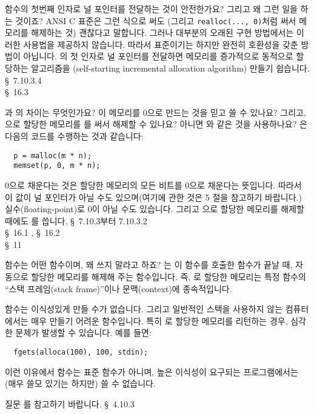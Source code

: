 \begin{faq}
	 함수의 첫번째 인자로 널 포인터를 전달하는
	것이 안전한가요? 그리고 왜 그런 일을 하는 것이죠?
\A
	ANSI C 표준은 그런 식으로 써도 (그리고 \verb+realloc(..., 0)+처럼
	써서 메모리를 해제하는 것) 괜찮다고 말합니다.  그러나 대부분의
	오래된 구현 방법에서는 이러한 사용법을 제공하지 않습니다.
	따라서 표준이기는 하지만 완전히 호환성을 갖춘 방법이 아닙니다.
	의 첫 인자로 널 포인터를 전달하면 메모리를
	증가적으로 동적으로 할당하는 알고리즘을 (self-starting incremental
	allocation algorithm) 만들기 쉽습니다.
\R
	\cite{c89} \S\ 7.10.3.4 \\
	\cite{hs} \S\ 16.3 
\end{faq}

\begin{faq}
	과 의 차이는 무엇인가요?
	이 메모리를 0으로 만드는 것을 믿고 쓸 수 있나요?
	그리고, 으로 할당한 메모리를 를 써서
	해제할 수 있나요? 아니면 와 같은 것을 사용하나요?
\A
	은 다음의 코드를 수행하는 것과 같습니다:
\begin{verbatim}
  p = malloc(m * n);
  memset(p, 0, m * n);
\end{verbatim}
	\noindent 0으로 채운다는 것은 할당한 메모리의 모든 비트를
	0으로 채운다는 뜻입니다.  따라서 이 값이 널 포인터가 아닐 수도
	있으며(여기에 관한 것은 5 절을 참고하기 바랍니다.)
	실수(floating-point)로 0이 아닐 수도 있습니다.
	그리고 으로 할당한 메모리를 해제할 때에도 를
	씁니다.
\R
	\cite{c89} \S\ 7.10.3부터 7.10.3.2 \\
	\cite{hs} \S\ 16.1 , \S\ 16.2  \\
	\cite{pcs} \S\ 11 
\end{faq}

\begin{faq}
	 함수는 어떤 함수이며, 왜 쓰지 말라고 하죠?
\A
	는 이 함수를 호출한 함수가 끝날 때, 자동으로 할당한
	메모리를 해제해 주는 함수입니다.  즉, 로 할당한 메모리는
	특정 함수의 ``스택 프레임(stack frame)''이나 문맥(context)에
	종속적입니다.

	 함수는 이식성있게 만들 수가 없습니다.  그리고
	일반적인 스택을 사용하지 않는 컴퓨터에서는 매우 만들기 어려운
	함수입니다.  특히 로 할당한 메모리를 리턴하는 경우,
	심각한 문제가 발생할 수 있습니다.  예를 들면:
\begin{verbatim}
  fgets(alloca(100), 100, stdin);
\end{verbatim}

	이런 이유에서  함수는 표준 함수가 아니며, 높은 이식성이
	요구되는 프로그램에서는 (매우 쓸모 있기는 하지만) 쓸 수 없습니다.

	질문 를 참고하기 바랍니다.
\R
	\cite{rationale} \S\ 4.10.3
\end{faq}

%
%

